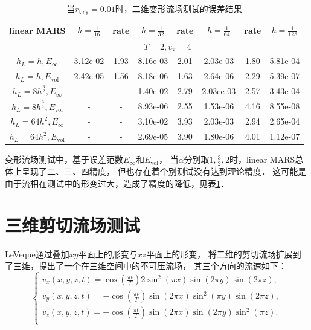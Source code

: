 \begin{table}[htb]
	\label{tab2}
	\centering
	\caption[二维变形流场测试的误差结果]{当$r_{\mathsf{tiny}}=0.01$时，二维变形流场测试的误差结果}
	\begin{tabular}{c|ccccccc}
		\hline \hline
		linear MARS
		&$h=\frac{1}{16}$ & rate & $h=\frac{1}{32}$ 
		& rate & $h=\frac{1}{64}$ & rate &  $h=\frac{1}{128}$
		\\ \hline 
		& \multicolumn{6}{c}{$T=2,v_{\mathrm{v}}=4$ }
		\\ \hline 
		$h_L=h,E_{\infty}$ & 3.12e-02 & 1.93 & 8.16e-03 & 2.01 &2.03e-03 & 1.80& 5.81e-04
		\\
		$h_L=h,E_{\mathrm{vol}}$  & 2.42e-05 & 1.56 & 8.18e-06 & 1.63 &2.64e-06 & 2.29 & 5.39e-07
		\\ \hline 
		$h_L=8h^{\frac{3}{2}},E_{\infty}$ & - & - & 1.40e-02 & 2.79 & 2.03ee-03 & 2.57 & 3.43e-04
		\\
		$h_L=8h^{\frac{3}{2}},E_{\mathrm{vol}}$  & - & - & 8.93e-06 & 2.55 &1.53e-06 & 4.16 & 8.55e-08
		\\ \hline 
		$h_L=64h^2,E_{\infty}$ & - & - & 3.10e-02 &3.93 &2.03e-03 & 2.94 & 2.65e-04
		\\
		$h_L=64h^2,E_{\mathrm{vol}}$  & - & - & 2.69e-05 & 3.90 &1.80e-06 & 4.01 & 1.12e-07
		\\ \hline \hline
	\end{tabular}
\end{table}  

变形流场测试中，基于误差范数$E_{\infty}$和$E_{\mathrm{vol}}$，
当$\alpha$分别取$1,\frac{3}{2},2$时，linear MARS总体上呈现了二、三、四精度，
但也存在着个别测试没有达到理论精度．
这可能是由于流相在测试中的形变过大，造成了精度的降低，见表\ref{tab2}．


\section{三维剪切流场测试}
LeVeque\cite{leveque96}通过叠加$xy$平面上的形变与$xz$平面上的形变，
将二维的剪切流场扩展到了三维，提出了一个在三维空间中的不可压流场，
其三个方向的流速如下：
\begin{equation*}\label{bilevel}
\left\{\begin{array}{l}
v_x(x,y,z,t)=\cos(\frac{\pi  t}{T})2\sin^2(\pi x)\sin(2\pi y)\sin(2\pi z),\\[0.2cm]
v_y(x,y,z,t)=-\cos(\frac{\pi t}{T})\sin(2\pi x)\sin^2(\pi y)\sin(2 \pi z),\\[0.2cm]
v_z(x,y,z,t)=-\cos(\frac{\pi t}{T})\sin(2\pi x)\sin(2\pi y)\sin^2(\pi z).\\[0.2cm]
\end{array}\right.
\end{equation*}



